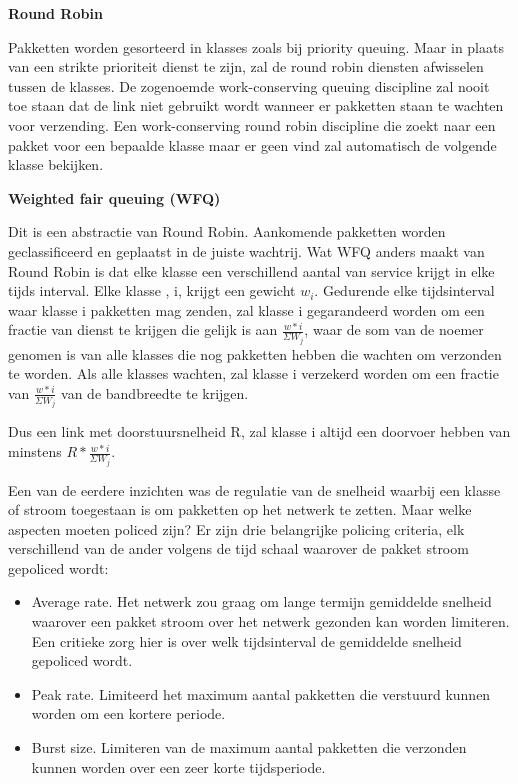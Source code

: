 \textbf{Round Robin}

Pakketten worden gesorteerd in klasses zoals bij priority queuing. Maar in plaats van een strikte prioriteit dienst te zijn, zal de round robin diensten afwisselen tussen de klasses. De zogenoemde work-conserving queuing discipline zal nooit toe staan dat de link niet gebruikt wordt wanneer er pakketten staan te wachten voor verzending. Een work-conserving round robin discipline die zoekt naar een pakket voor een bepaalde klasse maar er geen vind zal automatisch de volgende klasse bekijken.

\textbf{Weighted fair queuing (WFQ)}

\noindent Dit is een abstractie van Round Robin. Aankomende pakketten worden geclassificeerd en geplaatst in de juiste wachtrij. Wat WFQ anders maakt van Round Robin is dat elke klasse een verschillend aantal van service krijgt in elke tijds interval. Elke klasse , i, krijgt een gewicht $w_i$. Gedurende elke tijdsinterval waar klasse i pakketten mag zenden, zal klasse i gegarandeerd worden om een fractie van dienst te krijgen die gelijk is aan $\frac{w*i}{\Sigma W_j}$, waar de som van de noemer genomen is van alle klasses die nog pakketten hebben die wachten om verzonden te worden. Als alle klasses wachten, zal klasse i verzekerd worden om een fractie van $\frac{w*i}{\Sigma W_j}$ van de bandbreedte te krijgen.

\noindent Dus een link met doorstuursnelheid R, zal klasse i altijd een doorvoer hebben van minstens $R * \frac{w*i}{\Sigma W_j}$.


Een van de eerdere inzichten was de regulatie van de snelheid waarbij een klasse of stroom toegestaan is om pakketten op het netwerk te zetten. Maar welke aspecten moeten policed zijn? Er zijn drie belangrijke policing criteria, elk verschillend van de ander volgens de tijd schaal waarover de pakket stroom gepoliced wordt:

\begin{itemize}
\item 	Average rate. Het netwerk zou graag om lange termijn gemiddelde snelheid waarover een pakket stroom over het netwerk gezonden kan worden limiteren. Een critieke zorg hier is over welk tijdsinterval de gemiddelde snelheid gepoliced wordt.
\item 	Peak rate. Limiteerd het maximum aantal pakketten die verstuurd kunnen worden om een kortere periode.
\item 	Burst size. Limiteren van de maximum aantal pakketten die verzonden kunnen worden over een zeer korte tijdsperiode.
\end{itemize}

